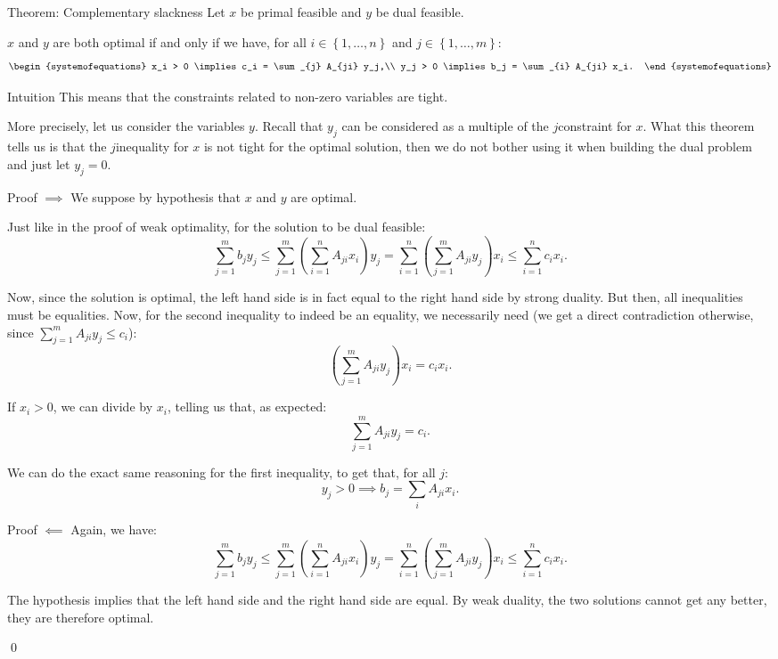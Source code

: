 \documentclass[a4paper]{article}
\begin{document}
\begin{parag}{Theorem: Complementary slackness}
    Let $x$ be primal feasible and $y$ be dual feasible.

    $x$ and $y$ are both optimal if and only if we have, for all $i \in \left\{1, \ldots, n\right\}$ and $j \in \left\{1, \ldots, m\right\}$: 
    \[\begin{systemofequations} x_i > 0 \implies c_i = \sum_{j} A_{ji} y_j,\\ y_j > 0 \implies b_j = \sum_{i} A_{ji} x_i. \end{systemofequations}\]
    
    \begin{subparag}{Intuition}
        This means that the constraints related to non-zero variables are tight. 

        More precisely, let us consider the variables $y$. Recall that $y_j$ can be considered as a multiple of the $j$\Th constraint for $x$. What this theorem tells us is that the $j$\Th inequality for $x$ is not tight for the optimal solution, then we do not bother using it when building the dual problem and just let $y_j = 0$.
    \end{subparag}

    \begin{subparag}{Proof $\implies$}
        We suppose by hypothesis that $x$ and $y$ are optimal. 

        Just like in the proof of weak optimality, for the solution to be dual feasible: 
        \[\sum_{j=1}^{m} b_j y_j \leq \sum_{j=1}^{m} \left(\sum_{i=1}^{n} A_{ji} x_i \right) y_j = \sum_{i=1}^{n} \left(\sum_{j=1}^{m} A_{ji} y_j\right) x_i \leq \sum_{i=1}^{n} c_i x_i.\]
        
        Now, since the solution is optimal, the left hand side is in fact equal to the right hand side by strong duality. But then, all inequalities must be equalities. Now, for the second inequality to indeed be an equality, we necessarily need (we get a direct contradiction otherwise, since $\sum_{j=1}^{m} A_{ji} y_j \leq c_i$): 
        \[\left(\sum_{j=1}^{m} A_{ji}y_j\right) x_i = c_i x_i.\]

        If $x_i > 0$, we can divide by $x_i$, telling us that, as expected:
        \[\sum_{j=1}^{m} A_{ji} y_j = c_i.\]

        We can do the exact same reasoning for the first inequality, to get that, for all $j$: 
        \[y_j > 0 \implies b_j = \sum_{i} A_{ji} x_i.\]
    \end{subparag}

    \begin{subparag}{Proof $\impliedby$}
        Again, we have:
        \[\sum_{j=1}^{m} b_j y_j \leq \sum_{j=1}^{m} \left(\sum_{i=1}^{n} A_{ji} x_i \right) y_j = \sum_{i=1}^{n} \left(\sum_{j=1}^{m} A_{ji} y_j\right) x_i \leq \sum_{i=1}^{n} c_i x_i.\]

        The hypothesis implies that the left hand side and the right hand side are equal. By weak duality, the two solutions cannot get any better, they are therefore optimal.

        \qed
    \end{subparag}
\end{parag}
\end{document}
